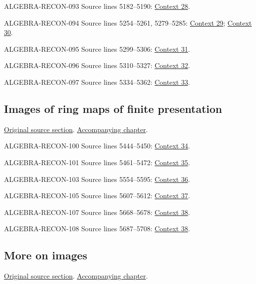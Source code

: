 \begin{AlgebraSourceRoutes}
\item[ALGEBRA-RECON-093] Source lines 5182--5190: \hyperlink{algebra-context-028}{Context 28}.
\item[ALGEBRA-RECON-094] Source lines 5254--5261, 5279--5285: \hyperlink{algebra-context-029}{Context 29}; \hyperlink{algebra-context-030}{Context 30}.
\item[ALGEBRA-RECON-095] Source lines 5299--5306: \hyperlink{algebra-context-031}{Context 31}.
\item[ALGEBRA-RECON-096] Source lines 5310--5327: \hyperlink{algebra-context-032}{Context 32}.
\item[ALGEBRA-RECON-097] Source lines 5334--5362: \hyperlink{algebra-context-033}{Context 33}.
\end{AlgebraSourceRoutes}

\subsection{Images of ring maps of finite presentation}
\hypertarget{algebra-source-section-images-finite-presentation}{}
\noindent\href{https://github.com/stacks/stacks-project/blob/a04446e57ec1fbc252a871afcec7752fb2807b14/algebra.tex\#L5371}{Original source section}. \href{algebra.pdf\#nameddest=section-images-finite-presentation}{Accompanying chapter}.

\begin{AlgebraSourceRoutes}
\item[ALGEBRA-RECON-100] Source lines 5444--5450: \hyperlink{algebra-context-034}{Context 34}.
\item[ALGEBRA-RECON-101] Source lines 5461--5472: \hyperlink{algebra-context-035}{Context 35}.
\item[ALGEBRA-RECON-103] Source lines 5554--5595: \hyperlink{algebra-context-036}{Context 36}.
\item[ALGEBRA-RECON-105] Source lines 5607--5612: \hyperlink{algebra-context-037}{Context 37}.
\item[ALGEBRA-RECON-107] Source lines 5668--5678: \hyperlink{algebra-context-038}{Context 38}.
\item[ALGEBRA-RECON-108] Source lines 5687--5708: \hyperlink{algebra-context-038}{Context 38}.
\end{AlgebraSourceRoutes}

\subsection{More on images}
\hypertarget{algebra-source-section-more-images}{}
\noindent\href{https://github.com/stacks/stacks-project/blob/a04446e57ec1fbc252a871afcec7752fb2807b14/algebra.tex\#L5721}{Original source section}. \href{algebra.pdf\#nameddest=section-more-images}{Accompanying chapter}.

